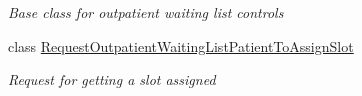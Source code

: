 \begin{DoxyCompactItemize}
\begin{DoxyCompactList}\small\item\em Base class for outpatient waiting list controls \end{DoxyCompactList}\item 
class \hyperlink{class_general_health_care_elements_1_1_department_models_1_1_outpatient_1_1_waiting_list_1_1_reqf0cf500ea28fd461b6ca502bac291525}{Request\+Outpatient\+Waiting\+List\+Patient\+To\+Assign\+Slot}
\begin{DoxyCompactList}\small\item\em Request for getting a slot assigned \end{DoxyCompactList}\end{DoxyCompactItemize}
